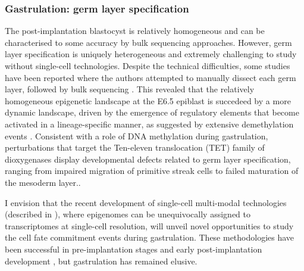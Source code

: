 \subsubsection{Gastrulation: germ layer specification}

The post-implantation blastocyst is relatively homogeneous and can be characterised to some accuracy by bulk sequencing approaches. However, germ layer specification is uniquely heterogeneous and extremely challenging to study without single-cell technologies. Despite the technical difficulties, some studies have been reported where the authors attempted to manually dissect each germ layer, followed by bulk sequencing \cite{Zhang2018}. This revealed that the relatively homogeneous epigenetic landscape at the E6.5 epiblast is succedeed by a more dynamic landscape, driven by the emergence of regulatory elements that become activated in a lineage-specific manner, as suggested by extensive demethylation events \cite{Zhang2018,Lee2015}. Consistent with a role of DNA methylation during gastrulation, perturbations that target the Ten-eleven translocation (TET) family of dioxygenases display developmental defects related to germ layer specification, ranging from impaired migration of primitive streak cells to failed maturation of the mesoderm layer.\cite{Dai2016}.

I envision that the recent development of single-cell multi-modal technologies (described in ), where epigenomes can be unequivocally assigned to transcriptomes at single-cell resolution, will unveil novel opportunities to study the cell fate commitment events during gastrulation. These methodologies have been successful in pre-implantation stages \cite{Guo2017,Wang2019,Liu2019} and early post-implantation development \cite{Rulands2018}, but gastrulation has remained elusive.

